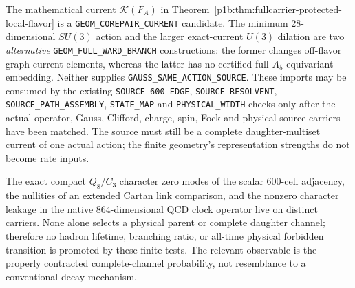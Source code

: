 \documentclass[12pt,a4paper]{article}
\begin{document}
\begin{remark}
\label{p5c:rem:fullcarrier-decay-source-imports}
The mathematical current $\mathscr K(F_A)$ in
Theorem~\ref{p1b:thm:fullcarrier-protected-local-flavor} is a
\texttt{GEOM\_COREPAIR\_CURRENT} candidate.  The minimum
$28$-dimensional $SU(3)$ action and the larger exact-current
$U(3)$ dilation are two \emph{alternative}
\texttt{GEOM\_FULL\_WARD\_BRANCH} constructions:
the former changes off-flavor graph current elements, whereas the
latter has no certified full $A_5$-equivariant embedding.  Neither
supplies \texttt{GAUSS\_SAME\_ACTION\_SOURCE}.
These imports may be consumed by the existing
\texttt{SOURCE\_600\_EDGE}, \texttt{SOURCE\_RESOLVENT},
\texttt{SOURCE\_PATH\_ASSEMBLY}, \texttt{STATE\_MAP} and
\texttt{PHYSICAL\_WIDTH} checks only after the actual operator,
Gauss, Clifford, charge, spin, Fock and physical-source carriers have
been matched.  The source must still be a complete daughter-multiset
current of one actual action; the finite geometry's representation
strengths do not become rate inputs.
\end{remark}

\begin{remark}
\label{p5c:rem:v3027-transition-promotion-boundary}
The exact compact $Q_8/C_3$ character zero modes of the scalar
$600$-cell adjacency, the nullities of an extended Cartan link
comparison, and the nonzero character leakage in the native
$864$-dimensional QCD clock operator live on distinct carriers.
None alone selects a physical parent or complete daughter channel;
therefore no hadron lifetime, branching ratio, or all-time physical
forbidden transition is promoted by these finite tests.
The relevant observable is the properly contracted complete-channel
probability, not resemblance to a conventional decay mechanism.
\end{remark}


\end{document}
